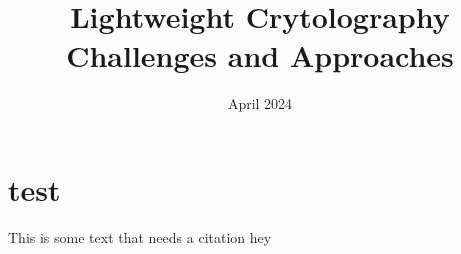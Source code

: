 \documentclass{article}
\title{Lightweight Crytolography Challenges and Approaches}
\author{}
\date{April 2024}
\begin{document}
\maketitle



\section*{test}
This is some text that needs a citation
hey \cite{GoogleTinkAEAD}

\end{document}

